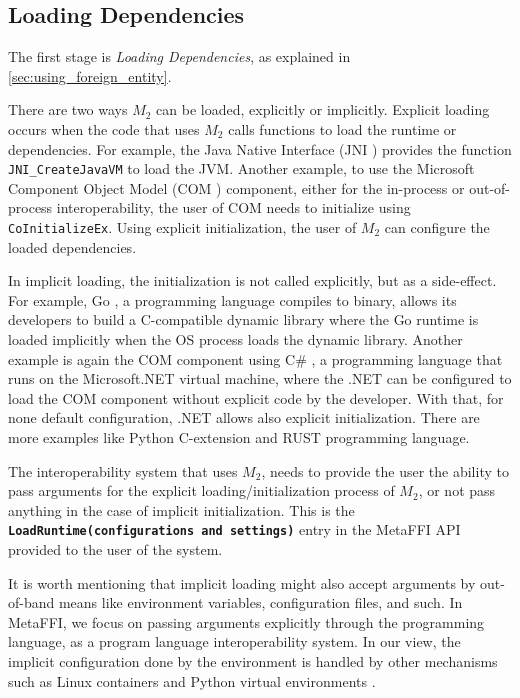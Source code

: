 \documentclass[sigplan,10pt,manuscript,nonacm]{acmart}
\begin{document}
\subsection{Loading Dependencies} \label{sec:loading_dependencies}
The first stage is \textit{Loading Dependencies}, as explained in \ref{sec:using_foreign_entity}.

There are two ways $M_2$ can be loaded, explicitly or implicitly. Explicit loading occurs when the code that uses $M_2$ calls functions to load the runtime or dependencies. For example, the Java Native Interface (JNI \cite{jni}) provides the function \texttt{JNI\_CreateJavaVM} to load the JVM. Another example, to use the Microsoft Component Object Model (COM \cite{com_component}) component, either for the in-process or out-of-process interoperability, the user of COM needs to initialize using \texttt{CoInitializeEx}. Using explicit initialization, the user of $M_2$ can configure the loaded dependencies.

In implicit loading, the initialization is not called explicitly, but as a side-effect. For example, Go \cite{golang}, a programming language compiles to binary, allows its developers to build a C-compatible dynamic library where the Go runtime is loaded implicitly when the OS process loads the dynamic library.  Another example is again the COM component using C\# \cite{c_sharp}, a programming language that runs on the Microsoft.NET virtual machine, where the .NET can be configured to load the COM component without explicit code by the developer. With that, for none default configuration, .NET allows also explicit initialization. There are more examples like Python C-extension \cite{pyhton_c_extension} and RUST \cite{rust} programming language.

The interoperability system that uses $M_2$, needs to provide the user the ability to pass arguments for the explicit loading/initialization process of $M_2$, or not pass anything in the case of implicit initialization. This is the \texttt{\textbf{LoadRuntime(configurations and settings)}} entry in the MetaFFI API provided to the user of the system.

It is worth mentioning that implicit loading might also accept arguments by out-of-band means like environment variables, configuration files, and such. In MetaFFI, we focus on passing arguments explicitly through the programming language, as a program language interoperability system. In our view, the implicit configuration done by the environment is handled by other mechanisms such as Linux containers \cite{container} and Python virtual environments \cite{python_virtual_environment}.
\end{document}
